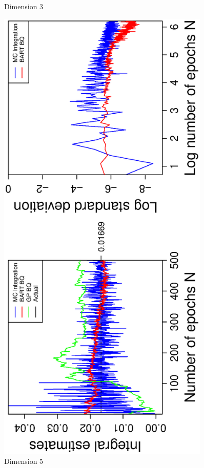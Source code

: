 \begin{figure}[H]
\begin{minipage}[b]{0.4\textwidth}
     \vspace{-1cm}
     \caption{Dimension 3}
  \end{minipage}
    \hspace{1.5cm}
  \begin{minipage}[b]{0.4\textwidth}
    \includegraphics[width= 0.9\textwidth, angle = -90]{report/Figures/4/convergenceMean45Dimensions.eps}
    \vspace{-1cm}
    \caption{Dimension 5}
  \end{minipage}
\end{figure}
\vspace{-1cm}

